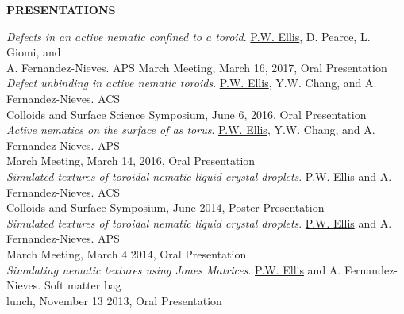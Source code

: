 \documentclass[10pt]{article}
\newenvironment{changemargin}[2]{%
  \list{}{\rightmargin#2\leftmargin#1
    \parsep=0pt\topsep=1pt\partopsep=0pt}
\item[]} {\endlist}
\newenvironment{indentmore}{\begin{changemargin}{10pt}{0cm}}{\end{changemargin}}
\begin{document}
\begin{indentmore}
\end{indentmore}

\newpage
\textbf{\large PRESENTATIONS}
\begin{indentmore}
\emph{Defects in an active nematic confined to a toroid}. \underline{P.W. Ellis}, D. Pearce, L. Giomi, and \\ \hspace*{15pt} A. Fernandez-Nieves. APS March Meeting, March 16, 2017, Oral Presentation\\

\emph{Defect unbinding in active nematic toroids}. \underline{P.W. Ellis}, Y.W. Chang, and A. Fernandez-Nieves. ACS\\ \hspace*{15pt} Colloids and Surface Science Symposium, June 6, 2016, Oral Presentation\\

\emph{Active nematics on the surface of as torus}. \underline{P.W. Ellis}, Y.W. Chang, and A. Fernandez-Nieves. APS\\ \hspace*{15pt} March Meeting, March 14, 2016, Oral Presentation\\

\emph{Simulated textures of toroidal nematic liquid crystal droplets}. \underline{P.W. Ellis} and A. Fernandez-Nieves. ACS\\ \hspace*{15pt} Colloids and Surface Symposium, June 2014, Poster Presentation\\

\emph{Simulated textures of toroidal nematic liquid crystal droplets}. \underline{P.W. Ellis} and A. Fernandez-Nieves. APS\\ \hspace*{15pt} March Meeting, March 4 2014, Oral Presentation\\

\emph{Simulating nematic textures using Jones Matrices}. \underline{P.W. Ellis} and A. Fernandez-Nieves. Soft matter bag\\ \hspace*{15pt} lunch, November 13 2013, Oral Presentation\\
\end{indentmore}
\end{document}

